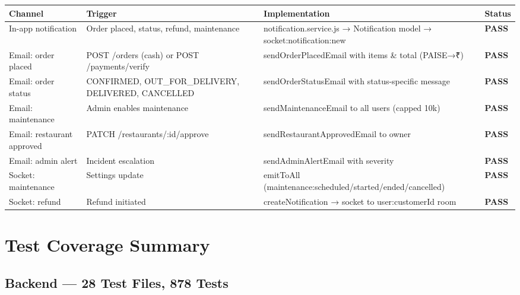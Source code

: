 \documentclass[11pt,a4paper]{article}
\newcommand{\PASS}{\colorbox{successgreen!20}{\color{successgreen}\bfseries\small PASS}}
\begin{document}
\begin{tabularx}{\textwidth}{@{}p{4cm}lXl@{}}
\toprule
\rowcolor{navyblue}\color{white}\bfseries Channel & \color{white}\bfseries Trigger & \color{white}\bfseries Implementation & \color{white}\bfseries Status \\
\midrule
In-app notification   & Order placed, status, refund, maintenance & notification.service.js → Notification model → socket:notification:new & \PASS \\
\rowcolor{rowalt}
Email: order placed   & POST /orders (cash) or POST /payments/verify & sendOrderPlacedEmail with items \& total (PAISE→₹) & \PASS \\
Email: order status   & CONFIRMED, OUT\_FOR\_DELIVERY, DELIVERED, CANCELLED & sendOrderStatusEmail with status-specific message & \PASS \\
\rowcolor{rowalt}
Email: maintenance    & Admin enables maintenance & sendMaintenanceEmail to all users (capped 10k) & \PASS \\
Email: restaurant approved & PATCH /restaurants/:id/approve & sendRestaurantApprovedEmail to owner & \PASS \\
\rowcolor{rowalt}
Email: admin alert    & Incident escalation & sendAdminAlertEmail with severity & \PASS \\
Socket: maintenance   & Settings update & emitToAll (maintenance:scheduled/started/ended/cancelled) & \PASS \\
\rowcolor{rowalt}
Socket: refund        & Refund initiated & createNotification → socket to user:customerId room & \PASS \\
\bottomrule
\end{tabularx}

\section{Test Coverage Summary}

\subsection{Backend — 28 Test Files, 878 Tests}
\end{document}
